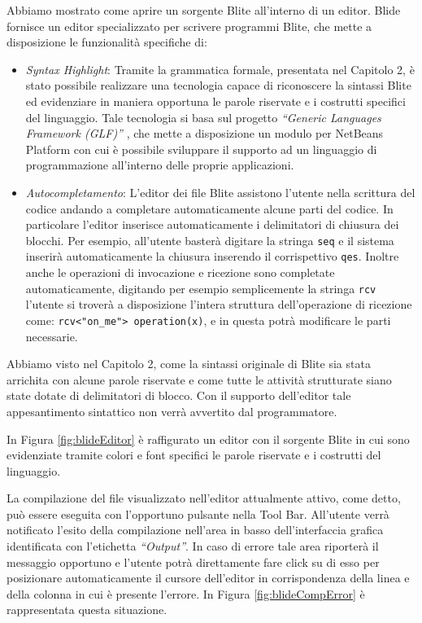 Abbiamo mostrato come aprire un sorgente Blite all'interno di un editor. Blide
fornisce un editor specializzato per scrivere programmi Blite, che mette a
disposizione le funzionalità specifiche di:

\begin{itemize}
  \item \emph{Syntax Highlight}: Tramite la grammatica formale, presentata
  nel Capitolo 2,  è stato possibile realizzare una tecnologia capace di 
  riconoscere la sintassi Blite ed evidenziare in maniera opportuna le parole
  riservate  e i costrutti specifici del linguaggio. Tale tecnologia si basa
  sul progetto \emph{``Generic Languages Framework (GLF)''} \cite{GLFSite}, che
  mette a disposizione un modulo per NetBeans Platform con cui è possibile sviluppare 
  il supporto ad un linguaggio di programmazione all'interno delle proprie 
  applicazioni.
  
  \item \emph{Autocompletamento}: L'editor dei file Blite assistono
  l'utente nella scrittura del codice andando a completare automaticamente
  alcune parti del codice. In particolare l'editor inserisce automaticamente i
  delimitatori di chiusura dei blocchi. Per esempio, all'utente basterà digitare
  la stringa \texttt{seq} e il sistema inserirà automaticamente la chiusura
  inserendo il corrispettivo \texttt{qes}. Inoltre anche le operazioni di
  invocazione e ricezione sono completate automaticamente, digitando per
  esempio semplicemente la stringa \texttt{rcv} l'utente si troverà a
  disposizione l'intera struttura dell'operazione di ricezione come: 
  \verb#rcv<"on_me"> operation(x)#, e in questa potrà modificare
  le parti necessarie.
  
\end{itemize}

Abbiamo visto nel Capitolo 2, come la sintassi originale di Blite sia stata
arrichita con alcune parole riservate e come tutte le attività strutturate siano state
dotate di delimitatori di blocco. Con il supporto dell'editor tale
appesantimento sintattico non verrà avvertito dal programmatore.
  
In Figura \ref{fig:blideEditor} è raffigurato un editor con il sorgente Blite in
cui sono evidenziate tramite colori e font specifici le parole riservate e i
costrutti del linguaggio.
	
La compilazione del file visualizzato nell'editor attualmente attivo, come
detto, può essere eseguita con l'opportuno pulsante nella Tool Bar. All'utente
verrà notificato l'esito della compilazione nell'area in basso
dell'interfaccia grafica identificata con l'etichetta \emph{``Output''}. In caso di
errore tale area riporterà il messaggio opportuno e l'utente potrà direttamente
fare click su di esso per posizionare automaticamente il cursore dell'editor in
corrispondenza della linea e della colonna in cui è presente l'errore. In
Figura \ref{fig:blideCompError} è rappresentata questa situazione.

